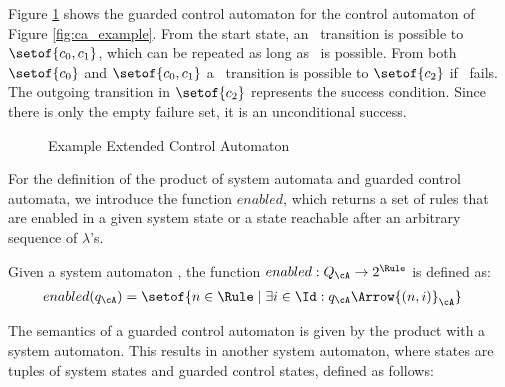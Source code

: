 \begin{example} Figure \ref{fig:eca_example} shows the guarded control automaton for the control automaton of Figure \ref{fig:ca_example}.
From the start state, an \propagate~transition is possible to $\setof{c_0,c_1}$, which can be repeated as long as \propagate~is possible. From both $\setof{c_0}$ and $\setof{c_0,c_1}$ a \dispatch~transition is possible to $\setof{c_2}$ if \propagate~fails. The outgoing transition in $\setof{c_2}$ represents the success condition. Since there is only the empty failure set, it is an unconditional success.
\end{example}
%
\begin{figure}
\centering
{}
\caption{Example Extended Control Automaton}
\label{fig:eca_example}
\end{figure}
%
For the definition of the product of system automata and guarded control automata, we introduce the function $enabled$, which returns a set of rules that are enabled in a given system state or a state reachable after an arbitrary sequence of $\lambda$'s. 
%
\begin{definition}
Given a system automaton \cA, the function $enabled: Q_{\cA} \rightarrow 2^{\Rule}$ is defined as:
\begin{align*}
enabled(q_{\cA}) &= \setof{ n \in \Rule \mid \exists i \in \Id : q_\cA \Arrow{(n,i)}_{\cA} }
\end{align*}
\end{definition}
%
The semantics of a guarded control automaton is given by the product with a system automaton. This results in another system automaton, where states are tuples of system states and guarded control states, defined as follows:
